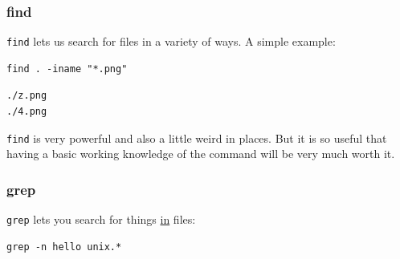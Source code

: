 \documentclass[11pt]{article}
\begin{document}
\subsubsection{find}
\label{sec:orgd4229e2}

\texttt{find} lets us search for files in a variety of ways. A simple
example:

\begin{verbatim}
find . -iname "*.png"
\end{verbatim}

\begin{verbatim}
./z.png
./4.png
\end{verbatim}

\texttt{find} is very powerful and also a little weird in places. But it is
so useful that having a basic working knowledge of the command will be
very much worth it.

\subsubsection{grep}
\label{sec:org609876a}

\texttt{grep} lets you search for things \uline{in} files:

\begin{verbatim}
grep -n hello unix.*
\end{verbatim}
\end{document}
